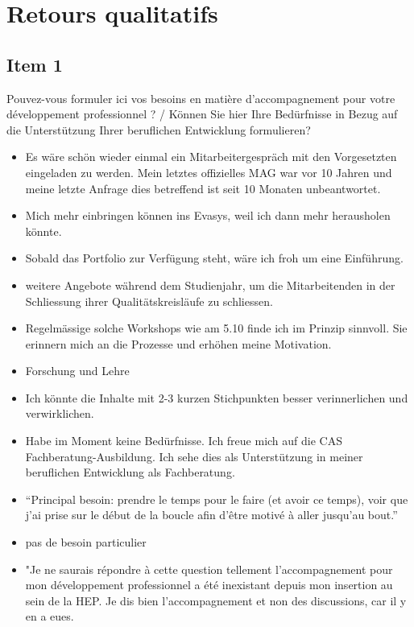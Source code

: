 \documentclass[
  french,
]{article}
\providecommand{\tightlist}{%
  \setlength{\itemsep}{0pt}\setlength{\parskip}{0pt}}
\begin{document}
{\section{Retours qualitatifs}\label{retours-qualitatifs}}

\hypertarget{item-1}{%
\subsection{Item 1}\label{item-1}}

Pouvez-vous formuler ici vos besoins en matière d'accompagnement pour votre développement professionnel ? / Können Sie hier Ihre Bedürfnisse in Bezug auf die Unterstützung Ihrer beruflichen Entwicklung formulieren?

\begin{itemize}
\tightlist
\item
  Es wäre schön wieder einmal ein Mitarbeitergespräch mit den Vorgesetzten eingeladen zu werden. Mein letztes offizielles MAG war vor 10 Jahren und meine letzte Anfrage dies betreffend ist seit 10 Monaten unbeantwortet.
\item
  Mich mehr einbringen können ins Evasys, weil ich dann mehr herausholen könnte.
\item
  Sobald das Portfolio zur Verfügung steht, wäre ich froh um eine Einführung.
\item
  weitere Angebote während dem Studienjahr, um die Mitarbeitenden in der Schliessung ihrer Qualitätskreisläufe zu schliessen.
\item
  Regelmässige solche Workshops wie am 5.10 finde ich im Prinzip sinnvoll. Sie erinnern mich an die Prozesse und erhöhen meine Motivation.
\item
  Forschung und Lehre
\item
  Ich könnte die Inhalte mit 2-3 kurzen Stichpunkten besser verinnerlichen und verwirklichen.
\item
  Habe im Moment keine Bedürfnisse.
  Ich freue mich auf die CAS Fachberatung-Ausbildung. Ich sehe dies als Unterstützung in meiner beruflichen Entwicklung als Fachberatung.
\item
  ``Principal besoin: prendre le temps pour le faire (et avoir ce temps), voir que j'ai prise sur le début de la boucle afin d'être motivé à aller jusqu'au bout.''
\item
  pas de besoin particulier
\item
  "Je ne saurais répondre à cette question tellement l'accompagnement pour mon développement professionnel a été inexistant depuis mon insertion au sein de la HEP. Je dis bien l'accompagnement et non des discussions, car il y en a eues.

\end{itemize}
\end{document}
